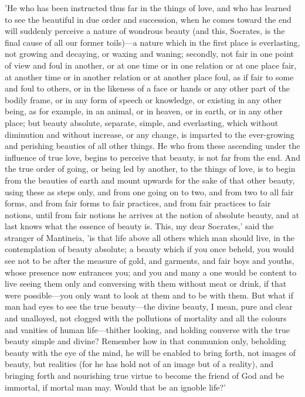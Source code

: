 \documentclass[11pt,letter]{article}
\begin{document}
\par  'He who has been instructed thus far in the things of love, and who has learned to see the beautiful in due order and succession, when he comes toward the end will suddenly perceive a nature of wondrous beauty (and this, Socrates, is the final cause of all our former toils)—a nature which in the first place is everlasting, not growing and decaying, or waxing and waning; secondly, not fair in one point of view and foul in another, or at one time or in one relation or at one place fair, at another time or in another relation or at another place foul, as if fair to some and foul to others, or in the likeness of a face or hands or any other part of the bodily frame, or in any form of speech or knowledge, or existing in any other being, as for example, in an animal, or in heaven, or in earth, or in any other place; but beauty absolute, separate, simple, and everlasting, which without diminution and without increase, or any change, is imparted to the ever-growing and perishing beauties of all other things. He who from these ascending under the influence of true love, begins to perceive that beauty, is not far from the end. And the true order of going, or being led by another, to the things of love, is to begin from the beauties of earth and mount upwards for the sake of that other beauty, using these as steps only, and from one going on to two, and from two to all fair forms, and from fair forms to fair practices, and from fair practices to fair notions, until from fair notions he arrives at the notion of absolute beauty, and at last knows what the essence of beauty is. This, my dear Socrates,' said the stranger of Mantineia, 'is that life above all others which man should live, in the contemplation of beauty absolute; a beauty which if you once beheld, you would see not to be after the measure of gold, and garments, and fair boys and youths, whose presence now entrances you; and you and many a one would be content to live seeing them only and conversing with them without meat or drink, if that were possible—you only want to look at them and to be with them. But what if man had eyes to see the true beauty—the divine beauty, I mean, pure and clear and unalloyed, not clogged with the pollutions of mortality and all the colours and vanities of human life—thither looking, and holding converse with the true beauty simple and divine? Remember how in that communion only, beholding beauty with the eye of the mind, he will be enabled to bring forth, not images of beauty, but realities (for he has hold not of an image but of a reality), and bringing forth and nourishing true virtue to become the friend of God and be immortal, if mortal man may. Would that be an ignoble life?'
\end{document}
